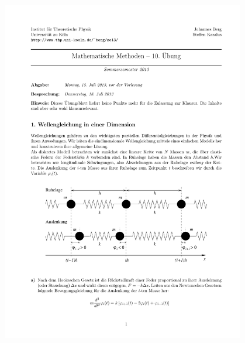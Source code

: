 \documentclass{scrartcl}
\begin{document}
\begin{figure}[htbp]
  \centering
  \includegraphics[width=0.95\textwidth]{img/chain}
\end{figure}
\end{document}
